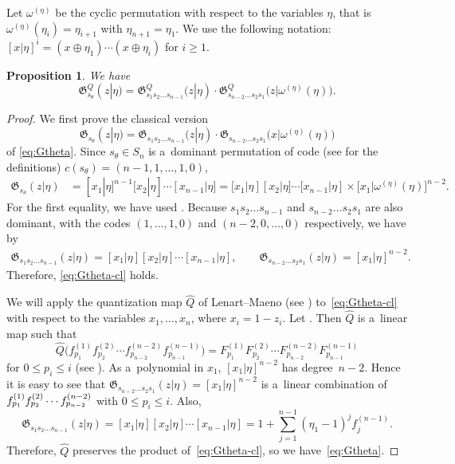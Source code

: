 \documentclass[10pt,a4paper]{amsart}
\numberwithin{equation}{section}
\newcommand{\Gro}[1]{\mathfrak{G}^Q_{#1}}
\newtheorem{Proposition}[Theorem]{Proposition}
\theoremstyle{definition}
\begin{document}
Let $\omega^{(\eta)}$ be the cyclic permutation with respect to the variables $\eta$, that is
$\omega^{(\eta)}(\eta_i)=\eta_{i+1}$
with $\eta_{n+1}=\eta_1$.
We use the following notation:
$
[x|\eta]^i=(x\oplus \eta_1)\cdots (x\oplus \eta_i)
$
for $i\ge 1$.
\begin{Proposition}
\label{prop:Gtheta}
We have
\begin{equation}
\Gro{s_\theta}(z|\eta)=\Gro{s_1s_2\dots s_{n-1}}(z|\eta)\cdot \Gro{s_{n-2}\dots s_2s_1}\bigl(z|\omega^{(\eta)}(\eta)\bigr)\label{eq:Gtheta}
.
\end{equation}
\end{Proposition}
\begin{proof}
We first prove
the classical version
\begin{equation}
\mathfrak{G}_{s_\theta}(z|\eta)=\mathfrak{G}_{s_1s_2\dots s_{n-1}}(z|\eta)\cdot \mathfrak{G}_{s_{n-2}\dots s_2s_1}\bigl(x|\omega^{(\eta)}(\eta)\bigr)
\label{eq:Gtheta-cl}
\end{equation}
of
\eqref{eq:Gtheta}.
Since
$s_\theta\in S_n$ is a~dominant permutation of
code (see \cite[Chapter~I]{Mac} for the definitions) $c(s_\theta)=(n-1,1,\dots,1,0)$,
\begin{align*}
\mathfrak{G}_{s_\theta}(z|\eta)&=
[x_1|\eta]^{n-1}
[x_2|\eta]
\cdots
[x_{n-1}| \eta]=[x_1|\eta]
[x_2|\eta]
\cdots
[x_{n-1}| \eta]\times
\big[x_1|\omega^{(\eta)}(\eta)\big]^{n-2}.
\end{align*}
For the first equality, we have used \cite[Lemma B.6]{MNS1}.
Because
$s_1s_2\dots s_{n-1}$
and $s_{n-2}\dots s_{2}s_1$
are also dominant, with the codes
$(1,\dots,1,0)$ and $ (n-2,0,\dots,0)$
respectively, we have by \cite[Lemma B.6]{MNS1}
\begin{gather*}%
\mathfrak{G}_{s_1s_2\dots s_{n-1}}(z|\eta)
=[x_1|\eta]
[x_2|\eta]
\cdots
[x_{n-1}| \eta],\qquad
\mathfrak{G}_{s_{n-2}\dots s_{2}s_1}(z|\eta)
=[x_1|\eta]^{n-2}.
\end{gather*}
Therefore, \eqref{eq:Gtheta-cl} holds.

We will apply the quantization map
$\hat{Q}$ of Lenart--Maeno (see \cite[Section~3]{LM}) to~\eqref{eq:Gtheta-cl} with respect to the variables
$x_1,\dots,x_n$, where $x_i=1-z_i$.
Let . Then
$\hat{Q}$ is a~linear map such that
\[\hat{Q}\bigl(f_{p_1}^{(1)}f_{p_2}^{(2)}\cdots f_{p_{n-2}}^{(n-2)}f_{p_{n-1}}^{(n-1)}\bigr)=F_{p_1}^{(1)}F_{p_2}^{(2)}\cdots F_{p_{n-2}}^{(n-2)}F_{p_{n-1}}^{(n-1)}
\]
for $0\le p_i\le i$ (see \cite[Proposition 3.16]{LM}).
As a~polynomial in $x_1$, $[x_1|\eta]^{n-2}$
has degree~${n-2}$.
Hence it is easy to see that
$\mathfrak{G}_{s_{n-2}\dots s_{2}s_1}(z|\eta)=[x_1|\eta]^{n-2}$
is a~linear combination of
$\smash{f_{p_1}^{(1)}f_{p_2}^{(2)}}\cdots\allowbreak\smash{ f_{p_{n-2}}^{(n-2)}}$ with $ 0\le p_i\le i$.
Also,
\begin{equation}
\mathfrak{G}_{s_{1}s_2\dots s_{n-1}}(z|\eta)=[x_1|\eta]
[x_2|\eta]
\cdots
[x_{n-1}| \eta]=
1+\sum_{j=1}^{n-1}
(\eta_1-1)^jf_j^{(n-1)}.
\label{eq:phi_(n-1)-2}
\end{equation}
Therefore,
$\hat{Q}$ preserves the product of~\eqref{eq:Gtheta-cl},
so we have~\eqref{eq:Gtheta}.
\end{proof}
\end{document}
